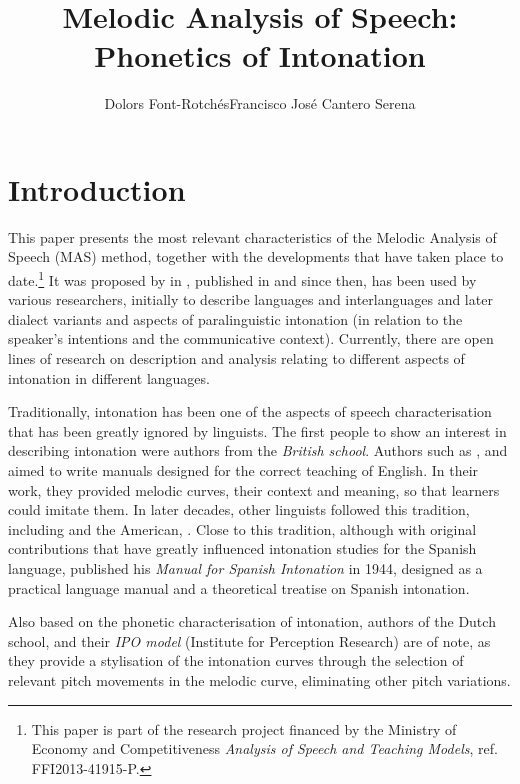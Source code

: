 \documentclass[output=paper]{langscibook}
\author{Dolors Font-Rotchés\lastand Francisco José Cantero Serena\affiliation{Universitat de Barcelona}}
\title{Melodic Analysis of Speech: Phonetics of Intonation}
\begin{document}
 
\label{chap:font}

\section{Introduction}

This paper presents the most relevant characteristics of the Melodic Analysis of Speech (MAS) method, together with the developments that have taken place to date.\footnote{This paper is part of the research project financed by the Ministry of Economy and Competitiveness \textit{Analysis of Speech and Teaching Models}, ref. FFI2013-41915-P.} It was proposed by \citeauthor{CanteroSerena.1999} in \citeyear{CanteroSerena.1999}, published in \citeyear{CanteroSerena.op.2002} and since then, has been used by various researchers, initially to describe languages and interlanguages and later dialect variants and aspects of paralinguistic intonation (in relation to the speaker's intentions and the communicative context). Currently, there are open lines of research on description and analysis relating to different aspects of intonation in different languages. 

Traditionally, intonation has been one of the aspects of speech characterisation that has been greatly ignored by linguists. The first people to show an interest in describing intonation were authors from the \textit{British school}. Authors such as \citet{Jones.1909,Palmer.1922}, and \citet{Armstrong.1926} aimed to write manuals designed for the correct teaching of English. In their work, they provided melodic curves, their context and meaning, so that learners could imitate them. In later decades, other linguists followed this tradition, including \citet{OConnor.1961,Crystal.1969,Cruttenden.1986} and the American, \citet{Bolinger.1986,Bolinger1989}. Close to this tradition, although with original contributions that have greatly influenced intonation studies for the Spanish language, \citeauthor{NavarroTomas.1944} published his \textit{Manual for Spanish Intonation} in 1944, designed as a practical language manual and a theoretical treatise on Spanish intonation.

Also based on the phonetic characterisation of intonation, authors of the Dutch school, \citet{Hart.1990} and their \textit{IPO model} (Institute for Perception Research) are of note, as they provide a stylisation of the intonation curves through the selection of relevant pitch movements in the melodic curve, eliminating other pitch variations.
\end{document}
